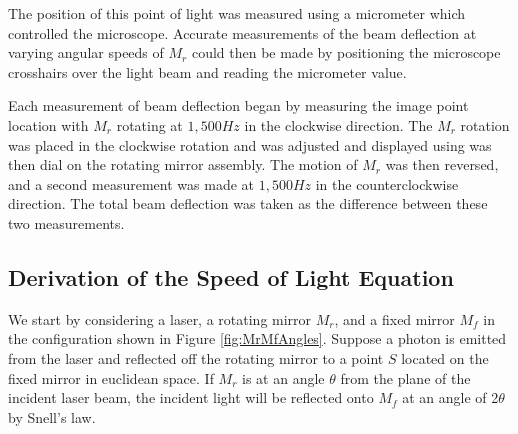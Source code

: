 \documentclass[twocolumn]{article}
\begin{document}
		The position of this point of light was measured using a micrometer which controlled the microscope.
		Accurate measurements of the beam deflection at varying angular speeds of $M_r$ could then be made by positioning the microscope crosshairs over the light beam and reading the micrometer value.
		
		Each measurement of beam deflection began by measuring the image point location with $M_r$ rotating at $1,500Hz$ in the clockwise direction.
		The $M_r$ rotation was placed in the clockwise rotation and was adjusted and displayed using was then dial on the rotating mirror assembly. 
		The motion of $M_r$ was then reversed, and a second measurement was made at $1,500Hz$ in the counterclockwise direction.
		The total beam deflection was taken as the difference between these two measurements.
			
	\subsection{Derivation of the Speed of Light Equation}
	\label{subsec:Derivation}
	We start by considering a laser, a rotating mirror $M_r$, and a fixed mirror $M_f$ in the configuration shown in Figure \ref{fig:MrMfAngles}. 
	Suppose a photon is emitted from the laser and reflected off the rotating mirror to a point $S$ located on the fixed mirror in euclidean space. 
	If $M_r$ is at an angle $\theta$ from the plane of the incident laser beam, the incident light will be reflected onto $M_f$ at an angle of 2$\theta$ by Snell's law.
	
\end{document}
